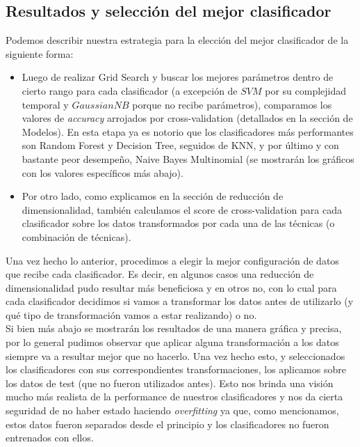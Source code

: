 \documentclass[a4paper]{article}
\begin{document}
\subsection{Resultados y selección del mejor clasificador}
Podemos describir nuestra estrategia para la elección del mejor clasificador de la siguiente forma:
\begin{itemize}
	\item  Luego de realizar Grid Search y buscar los mejores parámetros dentro de cierto rango para cada clasificador (a excepción de $SVM$ por su complejidad temporal y $GaussianNB$ porque no recibe parámetros), comparamos los valores de \textit{accuracy} arrojados por cross-validation (detallados en la sección de Modelos). En esta etapa ya es notorio que los clasificadores más performantes son Random Forest y Decision Tree, seguidos de KNN, y por último y con bastante peor desempeño, Naive Bayes Multinomial (se mostrarán los gráficos con los valores específicos más abajo).
	\item Por otro lado, como explicamos en la sección de reducción de dimensionalidad, también calculamos el score de cross-validation para cada clasificador sobre los datos transformados por cada una de las técnicas (o combinación de técnicas).
\end{itemize}

Una vez hecho lo anterior, procedimos a elegir la mejor configuración de datos que recibe cada clasificador. Es decir, en algunos casos una reducción de dimensionalidad pudo resultar más beneficiosa y en otros no, con lo cual para cada clasificador decidimos si vamos a transformar los datos antes de utilizarlo (y qué tipo de transformación vamos a estar realizando) o no. \\

Si bien más abajo se mostrarán los resultados de una manera gráfica y precisa, por lo general pudimos observar que aplicar alguna transformación a los datos siempre va a resultar mejor que no hacerlo. Una vez hecho esto, y seleccionados los clasificadores con sus correspondientes transformaciones, los aplicamos sobre los datos de test (que no fueron utilizados antes). Esto nos brinda una visión mucho más realista de la performance de nuestros clasificadores y nos da cierta seguridad de no haber estado haciendo \textit{overfitting} ya que, como mencionamos, estos datos fueron separados desde el principio y los clasificadores no fueron entrenados con ellos.
\end{document}
